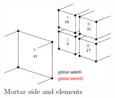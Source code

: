 \begin{figure}[h!]
\centering
\includegraphics[width=0.5\textwidth]{mortar.pdf}
\caption{Mortar side and elements}
\label{labelname}
\end{figure}




% 
% 
% 













